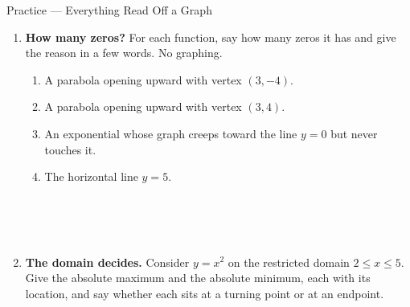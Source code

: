 \documentclass[10pt]{article}
\begin{document}
\begin{notesbox}{Practice --- Everything Read Off a Graph}
\begin{enumerate}[leftmargin=1.6em, itemsep=6pt, topsep=4pt]
\tcbbreak
\item \textbf{How many zeros?} For each function, say how many zeros it has and give the reason in a
few words. No graphing.
\begin{enumerate}[label=(\alph*), leftmargin=1.6em, itemsep=3pt, topsep=3pt]
  \item A parabola opening upward with vertex $(3,-4)$.
  \item A parabola opening upward with vertex $(3,4)$.
  \item An exponential whose graph creeps toward the line $y=0$ but never touches it.
  \item The horizontal line $y=5$.
\end{enumerate}

\\
\\
\\

\item \textbf{The domain decides.} Consider $y=x^2$ on the restricted domain $2 \le x \le 5$. Give
the absolute maximum and the absolute minimum, each with its location, and say whether each sits at
a turning point or at an endpoint.

\\
\\

\end{enumerate}
\end{notesbox}

\vspace{0.10in}
\end{document}

